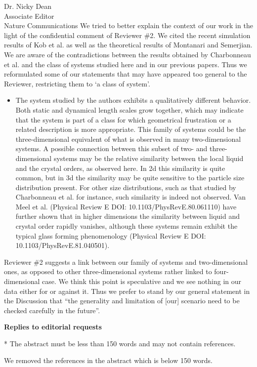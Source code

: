 \documentclass[a4paper, rebuttal, parskip=true, firsthead=false, fromemail=true, foldmarks=false]{scrlttr2}
\begin{document}
\begin{letter}{Dr. Nicky Dean\\
Associate Editor\\
Nature Communications}
We tried to better explain the context of our work in the light of the confidential comment of Reviewer \#2. We cited the recent simulation results of Kob et al. as well as the theoretical results of Montanari and Semerjian. We are aware of the contradictions between the results obtained by Charbonneau et al. and the class of systems studied here and in our previous papers. Thus we reformulated some of our statements that may have appeared too general to the Reviewer, restricting them to `a class of system'.

\begin{quotationi}
\begin{itemize}
\item The system studied by the authors exhibits a qualitatively different behavior. Both static and dynamical length scales grow together, which may indicate that the system is part of a class for which geometrical frustration or a related description is more appropriate. This family of systems could be the three-dimensional equivalent of what is observed in many two-dimensional systems. A possible connection between this subset of two- and three-dimensional systems may be the relative similarity between the local liquid and the crystal orders, as observed here. In 2d this similarity is quite common, but in 3d the similarity may be quite sensitive to the particle size distribution present. For other size distributions, such as that studied by Charbonneau et al. for instance, such similarity is indeed not observed. Van Meel et al. (Physical Review E DOI: 10.1103/PhysRevE.80.061110) have further shown that in higher dimensions the similarity between liquid and crystal order rapidly vanishes, although these systems remain exhibit the typical glass forming phenomenology (Physical Review E DOI: 10.1103/PhysRevE.81.040501).
\end{itemize}
\end{quotationi}

Reviewer \#2 suggests a link between our family of systems and two-dimensional ones, as opposed to other three-dimensional systems rather linked to four-dimensional case. We think this point is speculative and we see nothing in our data either for or against it. Thus we prefer to stand by our general statement in the Discussion that ``the generality and limitation of [our] scenario need to be checked carefully in the future''.

\textsf{\textbf{Replies to editorial requests}}

\begin{quotationi}
* The abstract must be less than 150 words and may not contain references.
\end{quotationi}
We removed the references in the abstract which is below 150 words.


\end{letter}
\end{document}
